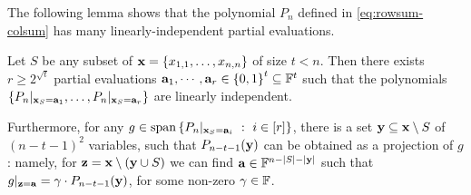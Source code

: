 \documentclass[11pt]{article}
\def\rowsum{\operatorname{rowSum}}
\def\colsum{\operatorname{colSum}}
\begin{document}
The following lemma shows that the polynomial $P_n$ defined in \eqref{eq:rowsum-colsum} has many linearly-independent partial evaluations. %
\begin{lemma}\label{lem:evalDim-rowsum-colsum}
  Let $S$ be any subset of $\mathbf{x}=\left\{ x_{1,1}, \ldots, x_{n,n} \right\}$ of size $t < n$.
Then there exists $r \geq 2^{\sqrt{t}}$ partial evaluations $\veca_1, \cdots, \veca_r \in \set{0,1}^t \subseteq \F^t$ such that the polynomials $\left\{ P_n|_{\mathbf{x}_S = \mathbf{a}_1}, \ldots, P_n|_{\mathbf{x}_S = \mathbf{a}_r} \right\}$ are linearly independent.

Furthermore, for any $g \in \operatorname{span}\left\{  P_n|_{\mathbf{x}_S = \mathbf{a}_i} \ : \ i \in [r] \right\}$, there is a set $\mathbf{y} \subseteq \mathbf{x} \setminus S$ of $(n-t-1)^2$ variables, such that $P_{n-t-1}(\mathbf{y})$ can be obtained as a projection of $g$: namely, for $\mathbf{z} = \mathbf{x} \setminus (\mathbf{y} \cup S)$ we can find $\veca \in \F^{n-|S|-|\vecy|}$ such that $ g|_{\mathbf{z}=\mathbf{a}}= \gamma \cdot P_{n-t-1}(\mathbf{y})$, for some non-zero $\gamma \in \F$.
\end{lemma}
\end{document}
